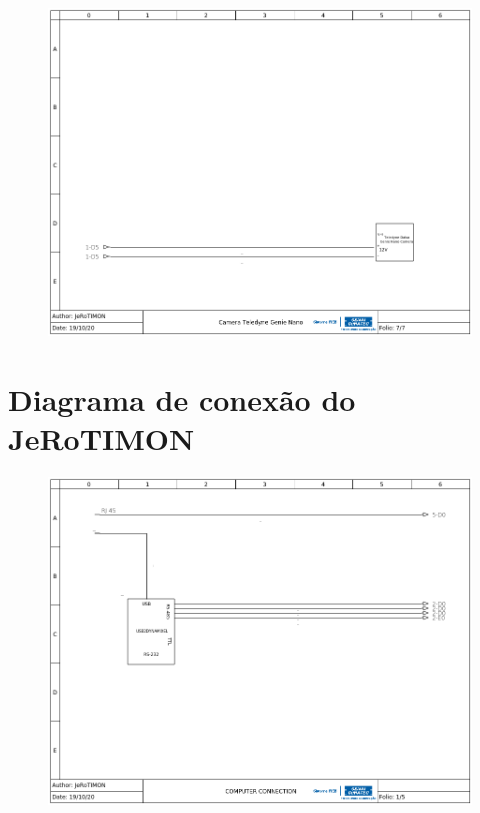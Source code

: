 \documentclass[
12pt,					%
openright,				%
twoside,				%
a4paper,				%
english,
brazil
]{ABNT/abntex2_report}
\begin{document}
	\begin{figure}[H]
		\centering
		\includegraphics[scale=0.72]{appendix/wiring_7.png}
		\label{fig:wiring7}
	\end{figure}


	\chapter{Diagrama de conexão do JeRoTIMON}
	\label{apend:connec_schem}
	\begin{figure}[H]
		\centering
		\includegraphics[scale=0.72]{appendix/connection_1.png}
		\label{fig:connection1}
	\end{figure}
\end{document}
